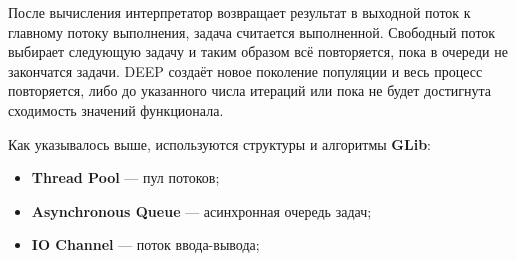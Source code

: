 После вычисления интерпретатор
возвращает результат в
выходной поток к главному потоку выполнения,
задача считается выполненной.
Свободный поток выбирает следующую задачу
и таким образом всё повторяется,
пока в очереди не закончатся задачи.
DEEP создаёт новое поколение популяции
и весь процесс повторяется,
либо до указанного числа итераций или
пока не будет достигнута сходимость
значений функционала.

Как указывалось выше,
используются структуры и алгоритмы
\textbf{GLib}\cite{GLib}:

\begin{itemize}
    \item \textbf{Thread Pool} --- пул потоков;
    \item \textbf{Asynchronous Queue} --- асинхронная очередь задач;
    \item \textbf{IO Channel} --- поток ввода-вывода;
\end{itemize}

